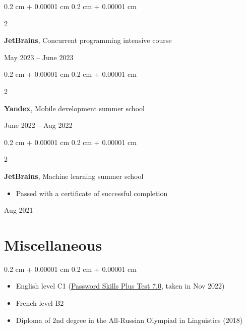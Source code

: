 \documentclass[10pt, letterpaper]{article}
\newenvironment{highlights}{
    \begin{itemize}[
        topsep=0.10 cm,
        parsep=0.10 cm,
        partopsep=0pt,
        itemsep=0pt,
        leftmargin=0.4 cm + 10pt
    ]
}{
    \end{itemize}
} %
\newenvironment{highlightsforbulletentries}{
    \begin{itemize}[
        topsep=0.10 cm,
        parsep=0.10 cm,
        partopsep=0pt,
        itemsep=0pt,
        leftmargin=10pt
    ]
}{
    \end{itemize}
} %
\newenvironment{onecolentry}{
    \begin{adjustwidth}{
        0.2 cm + 0.00001 cm
    }{
        0.2 cm + 0.00001 cm
    }
}{
    \end{adjustwidth}
} %
\newenvironment{twocolentry}[2][]{
    \onecolentry
    \def\secondColumn{#2}
    \setcolumnwidth{\fill, 4.5 cm}
    \begin{paracol}{2}
}{
    \switchcolumn \raggedleft \secondColumn
    \end{paracol}
    \endonecolentry
} %
\begin{document}
        \vspace{0.2 cm}

        \begin{twocolentry}{
            May 2023 – June 2023
        }
            \textbf{JetBrains}, Concurrent programming intensive course
        \end{twocolentry}


        \vspace{0.2 cm}

        \begin{twocolentry}{
            June 2022 – Aug 2022
        }
            \textbf{Yandex}, Mobile development summer school
        \end{twocolentry}


        \vspace{0.2 cm}

        \begin{twocolentry}{
            Aug 2021
        }
            \textbf{JetBrains}, Machine learning summer school
            \begin{highlights}
                \item Passed with a certificate of successful completion
            \end{highlights}
        \end{twocolentry}



    
    \section{Miscellaneous}

    \begin{onecolentry}
        \begin{highlightsforbulletentries}


        \item English level C1 (\href{https://drive.google.com/file/d/125A2hjAsJC6aRWulAMg6xOu1e6PfJCy9/view?usp=sharing}{Password Skills Plus Test 7.0}, taken in Nov 2022)

        \item French level B2

        \item Diploma of 2nd degree in the All-Russian Olympiad in Linguistics (2018)


        \end{highlightsforbulletentries}
    \end{onecolentry}
\end{document}
